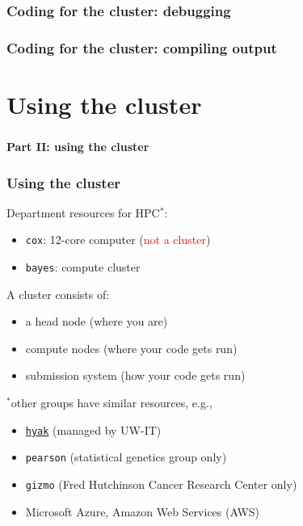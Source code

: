 \documentclass[12pt, 
hyperref={colorlinks=true, linkcolor=BlueViolet, urlcolor=BlueViolet},dvipsnames]{beamer}
\begin{document}
\begin{frame}
\frametitle{Coding for the cluster: debugging}

\end{frame}


\begin{frame}
\frametitle{Coding for the cluster: compiling output}

\end{frame}

\section{Using the cluster}
\begin{frame}
\frametitle{}
\begin{center}
{\large \textbf{Part II: using the cluster}}
\end{center}
\end{frame}

\begin{frame}
\frametitle{Using the cluster}
Department resources for HPC${}^*$: \vspace{-0.3cm} \pause
\begin{itemize}
\item \texttt{cox}: 12-core computer \pause (\textcolor{red}{not a cluster}) \pause
\item \texttt{bayes}: compute cluster
\end{itemize}

A cluster consists of: \vspace{-0.3cm} \pause
\begin{itemize}
\item a head node \pause (where you are) \pause
\item compute nodes \pause (where your code gets run) \pause
\item submission system \pause (how your code gets run) \pause
\end{itemize}

{\small ${}^*$other groups have similar resources, e.g., \vspace{-0.3cm}
\begin{itemize}
\item \href{https://itconnect.uw.edu/service/shared-scalable-compute-cluster-for-research-hyak/}{\texttt{hyak}} (managed by UW-IT)
\item \texttt{pearson} (statistical genetics group only)
\item \texttt{gizmo} (Fred Hutchinson Cancer Research Center only)
\item Microsoft Azure, Amazon Web Services (AWS)
\end{itemize}
}
\end{frame}
\end{document}
